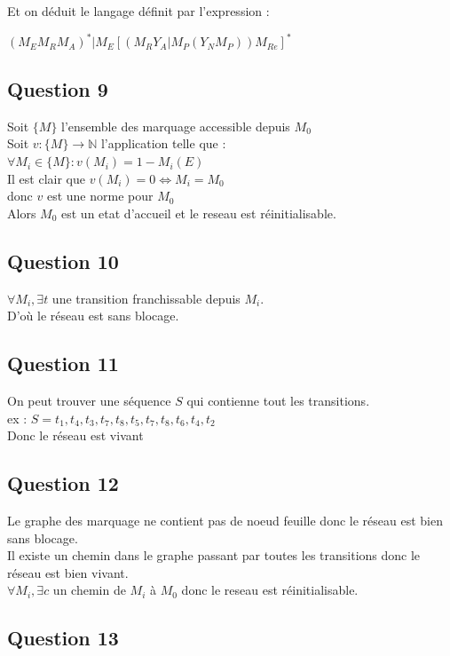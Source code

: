 Et on déduit le langage définit par l'expression :\\
\begin{center}
$(M_EM_RM_A)^*|M_E[(M_RY_A|M_P(Y_NM_P))M_{Re}]^*$
\end{center}

\subsection{Question 9}

Soit $\{M\}$ l'ensemble des marquage accessible depuis $M_0$\\
Soit $v : \{M\} \rightarrow \mathbb{N}$ l'application telle que :\\
$\forall M_i \in \{M\} : v(M_i) = 1-M_i(E)$\\
Il est clair que $v(M_i) = 0 \Leftrightarrow M_i = M_0$\\
\vspace{0.5cm}
donc $v$ est une norme pour $M_0$ \\
Alors $M_0$ est un etat d'accueil et le reseau est réinitialisable.


\subsection{Question 10}
$\forall M_i, \exists t$ une transition franchissable depuis $M_i$.\\
D'où le réseau est sans blocage.

\subsection{Question 11}

On peut trouver une séquence $S$ qui contienne tout les transitions.\\
ex : $S = t_1,t_4,t_3,t_7,t_8,t_5,t_7,t_8,t_6,t_4,t_2$\\
Donc le réseau est vivant

\subsection{Question 12}
Le graphe des marquage ne contient pas de noeud feuille donc le réseau est bien sans blocage.\\
Il existe un chemin dans le graphe passant par toutes les transitions donc le réseau est bien vivant.\\
$\forall M_i, \exists c$ un chemin de $M_i$ à $M_0$ donc le reseau est réinitialisable.

\subsection{Question 13}

